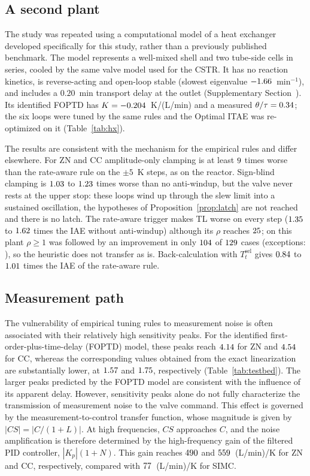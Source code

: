 \subsection{A second plant}
\label{subsec:hx}
The study was repeated using a computational model of a heat exchanger developed specifically for this study, rather than
a previously published benchmark. The model represents a well-mixed shell and two tube-side cells in series, cooled by the same valve model used for the CSTR. It has no reaction
kinetics, is reverse-acting and open-loop stable (slowest eigenvalue $-1.66$~min$^{-1}$), and includes a
$0.20$~min transport delay at the outlet (Supplementary Section~). Its identified FOPTD has $K = -0.204$~K/(L/min) and a measured $\theta/\tau = 0.34$; the six loops were tuned by the same rules and the Optimal ITAE was re-optimized
on it (Table~\ref{tab:hx}).

The results are consistent with the mechanism for the empirical rules and differ elsewhere. For ZN and CC amplitude-only clamping is at least $9$ times worse than the rate-aware
rule on the $\pm 5$~K steps, as on the reactor.
Sign-blind clamping is $1.03$ to
$1.23$ times worse than no anti-windup, but the valve never rests at the upper stop: these loops wind up through the slew limit into a sustained oscillation, the hypotheses of Proposition~\ref{prop:latch} are not reached and there is no latch. The rate-aware trigger makes TL worse on every step ($1.35$ to $1.62$ times the IAE without anti-windup) although its $\rho$ reaches $25$; on this plant $\rho \ge 1$ was followed by an improvement in only $104$ of $129$ cases (exceptions: \vhxbadloops{}), so the heuristic does not transfer as is. Back-calculation with $T_t^{\mathrm{sel}}$ gives $0.84$ to $1.01$ times the IAE of the rate-aware rule.



\subsection{Measurement path}
\label{subsec:measurement_path}
The vulnerability of empirical tuning rules to measurement noise is often associated with their relatively high sensitivity peaks. For the identified first-order-plus-time-delay (FOPTD) model, these peaks reach $4.14$ for ZN and $4.54$ for CC, whereas the corresponding values obtained from the exact linearization are substantially lower, at $1.57$ and $1.75$, respectively (Table~\ref{tab:testbed}). The larger peaks predicted by the FOPTD model are consistent with the influence of its apparent delay. However, sensitivity peaks alone do not fully characterize the transmission of measurement noise to the valve command. This effect is governed by the measurement-to-control transfer function, whose magnitude is given by $|CS| = |C/(1+L)|$. At high frequencies, $CS$ approaches $C$, and the noise amplification is therefore determined by the high-frequency gain of the filtered PID controller, $|K_p|(1+N)$. This gain reaches $490$ and $559$~(L/min)/K for ZN and CC, respectively, compared with $77$~(L/min)/K for SIMC.

